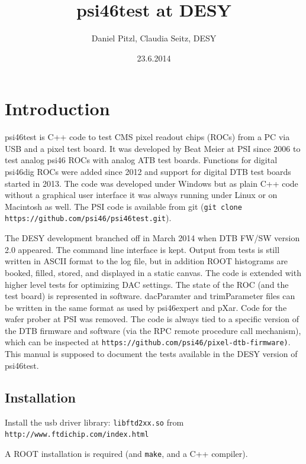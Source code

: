 \documentclass[english]{article}
\begin{document}
\title{\textbf{psi46test at DESY}}


\author{Daniel Pitzl, Claudia Seitz, DESY}


\date{23.6.2014}

\maketitle

\section{Introduction}

psi46test is C++ code to test CMS pixel readout chips (ROCs) from
a PC via USB and a pixel test board. It was developed by Beat Meier
at PSI since 2006 to test analog psi46 ROCs with analog ATB test boards.
Functions for digital psi46dig ROCs were added since 2012 and support
for digital DTB test boards started in 2013. The code was developed
under Windows but as plain C++ code without a graphical user interface
it was always running under Linux or on Macintosh as well. The PSI
code is available from git (\texttt{git clone https://github.com/psi46/psi46test.git}).

\noindent The DESY development branched off in March 2014 when DTB
FW/SW version 2.0 appeared. The command line interface is kept. Output
from tests is still written in ASCII format to the log file, but in
addition ROOT histograms are booked, filled, stored, and displayed
in a static canvas. The code is extended with higher level tests for
optimizing DAC settings. The state of the ROC (and the test board)
is represented in software. dacParamter and trimParameter files can
be written in the same format as used by psi46expert and pXar. Code
for the wafer prober at PSI was removed. The code is always tied to
a specific version of the DTB firmware and software (via the RPC remote
procedure call mechanism), which can be inspected at \texttt{https://github.com/psi46/pixel-dtb-firmware)}.
This manual is supposed to document the tests available in the DESY
version of psi46test.


\subsection{Installation}

Install the usb driver library: \texttt{libftd2xx.so} from \texttt{http://www.ftdichip.com/index.html}

A ROOT installation is required (and \texttt{make}, and a C++ compiler).
\end{document}

